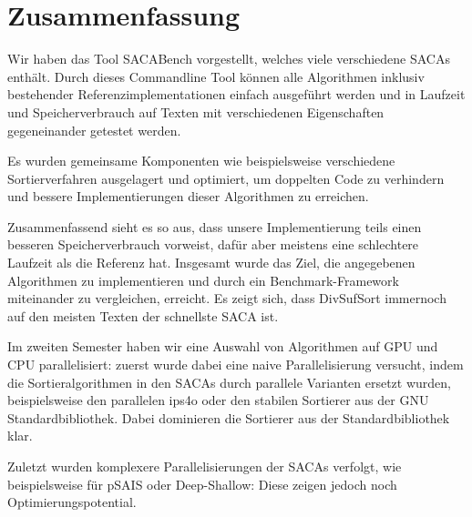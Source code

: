 \section{Zusammenfassung}

Wir  haben das Tool SACABench vorgestellt, welches viele verschiedene SACAs enthält.
Durch dieses Commandline Tool können alle Algorithmen inklusiv bestehender Referenzimplementationen einfach ausgeführt werden
und in Laufzeit und Speicherverbrauch auf Texten mit verschiedenen Eigenschaften gegeneinander getestet werden.

Es wurden gemeinsame Komponenten wie beispielsweise verschiedene Sortierverfahren ausgelagert und optimiert,
um doppelten Code zu verhindern und bessere Implementierungen dieser Algorithmen zu erreichen.

Zusammenfassend sieht es so aus, dass unsere Implementierung teils einen besseren Speicherverbrauch vorweist,
dafür aber meistens eine schlechtere Laufzeit als die Referenz hat.
Insgesamt wurde das Ziel, die angegebenen Algorithmen zu implementieren und
durch ein Benchmark-Framework miteinander zu vergleichen, erreicht.
Es zeigt sich, dass DivSufSort immernoch auf den meisten Texten der schnellste SACA ist.

Im zweiten Semester haben wir eine Auswahl von Algorithmen auf GPU und CPU parallelisiert:
zuerst wurde dabei eine naive Parallelisierung versucht, indem die Sortieralgorithmen in den SACAs durch
parallele Varianten ersetzt wurden, beispielsweise den parallelen ips4o oder
den stabilen Sortierer aus der GNU Standardbibliothek.
Dabei dominieren die Sortierer aus der Standardbibliothek klar.

Zuletzt wurden komplexere Parallelisierungen der SACAs verfolgt, wie beispielsweise für pSAIS
oder Deep-Shallow: 
Diese zeigen jedoch noch Optimierungspotential.